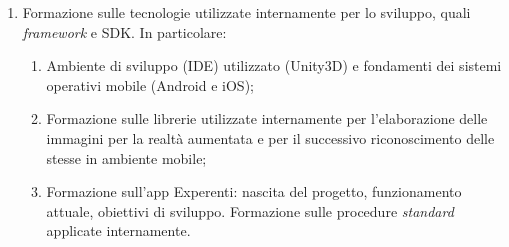 \begin{enumerate}
	\item	Formazione sulle tecnologie utilizzate internamente per lo sviluppo, quali \textit{framework} e SDK. In particolare:
	
	\begin{enumerate}	
		\item	Ambiente di sviluppo (IDE\gloss) utilizzato (Unity3D) e fondamenti dei sistemi operativi mobile (Android e iOS); 
		\item	Formazione sulle librerie utilizzate internamente per l’elaborazione delle immagini per la realtà aumentata e per il successivo riconoscimento delle stesse in ambiente mobile; 
		\item	Formazione sull’app Experenti: nascita del progetto, funzionamento attuale, obiettivi di sviluppo. Formazione sulle procedure \textit{standard} applicate internamente.	
	\end{enumerate}
	

\end{enumerate}
